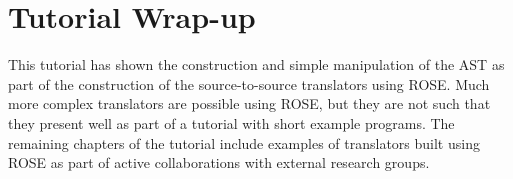 \chapter{Tutorial Wrap-up}

    This tutorial has shown the construction and simple manipulation of the AST as part of
the construction of the source-to-source translators using ROSE.  Much more complex
translators are possible using ROSE, but they are not such that they present well as part
of a tutorial with short example programs. The remaining chapters of the tutorial
include examples of translators built using ROSE as part of active collaborations with 
external research groups.



